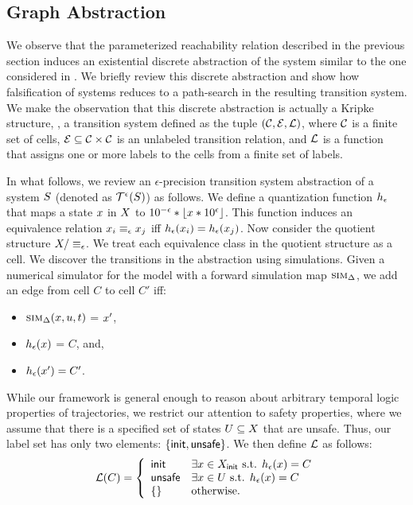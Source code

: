 \subsection{Graph Abstraction}

We observe that the parameterized reachability relation described in
the previous section induces an existential discrete abstraction of
the system similar to the one considered in \cite{zutshi2014multiple}.
We briefly review this discrete abstraction and show how falsification
of systems reduces to a path-search in the resulting transition
system. We make the observation that this discrete abstraction is
actually a Kripke structure, \ie, a transition system defined as the
tuple $(\mathcal{C}, \mathcal{E}, \mathcal{L})$, where $\mathcal{C}$ is
a finite set of cells, $\mathcal{E} \subseteq \mathcal{C} \times \mathcal{C}$ is
an unlabeled transition relation, and $\mathcal{L}$ is a
function that assigns one or more labels to the cells from a finite
set of labels.

In what follows, we review an $\epsilon$-precision transition system
abstraction of a system $S$ (denoted as
$\mathcal{T}^{\epsilon}(S)$) as follows. We define a
quantization function $h_\epsilon$ that maps a state $x$ in
$X$ to $10^{-\epsilon}*\lfloor x*10^\epsilon \rfloor$.
This function induces an equivalence relation $x_i
\equiv_\epsilon x_j$ iff $h_\epsilon(x_i) =
h_\epsilon(x_j)$. Now consider the quotient structure
$X/\equiv_\epsilon$. We treat each equivalence class in the
quotient structure as a cell. We discover the transitions in the
abstraction using simulations. Given a numerical simulator for the
model with a forward simulation map $\mbox{\sc sim}_\Delta$, we add an edge
from cell $C$ to cell $C'$ iff:
\begin{itemize}
\item
$\mbox{\sc sim}_\Delta(x, u, t)$ = $x'$, 
\item
$h_\epsilon(x)$ = $C$, and,
\item
$h_\epsilon(x') = C'$.
\end{itemize}

While our framework is general enough to reason about arbitrary
temporal logic properties of trajectories, we restrict our attention
to safety properties, where we assume that there is a specified set of
states $U \subseteq X$ that are unsafe.  Thus,
our label set has only two elements:
$\{\mathsf{init},\mathsf{unsafe}\}$. We then define $\mathcal{L}$ as
follows: 
\begin{equation*}
\CellLabelingFunction(C) = \left\{
\begin{array}{l@{\hspace{1em}}l}
\init   & \exists \contState \in \InitStates\text{ s.t.  }\quant_\epsilon(\contState) = C  \\
\unsafe & \exists \contState \in \UnsafeStates\text{ s.t.  }\quant_\epsilon(\contState) = C  \\
\{\}    & \text{otherwise.}    
\end{array}\right.
\end{equation*}



